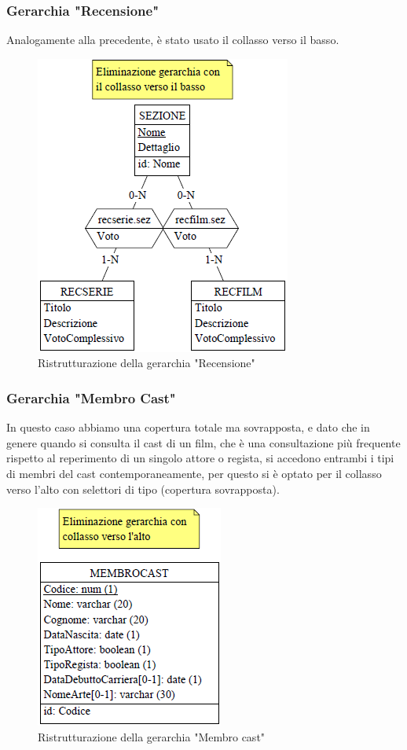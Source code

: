 \documentclass[a4paper,12pt]{report}
\begin{document}
	\subsubsection{Gerarchia "Recensione"}
	Analogamente alla precedente, è stato usato il collasso verso il basso.
	\begin{figure}[H]
		\centering
		\includegraphics{ER/ristrutturazione/ristrecensione.png}
		\caption{Ristrutturazione della gerarchia "Recensione"}
	\end{figure}
	\subsubsection{Gerarchia "Membro Cast"}
	In questo caso abbiamo una copertura totale ma sovrapposta, e dato che in genere quando si consulta il cast di un film, che è una consultazione più frequente rispetto al reperimento di un singolo attore o regista, si accedono entrambi i tipi di membri del cast contemporaneamente, per questo si è optato per il collasso verso l'alto con selettori di tipo (copertura sovrapposta).
	\begin{figure}[H]
		\centering
		\includegraphics{ER/ristrutturazione/ristmembrocast.png}
		\caption{Ristrutturazione della gerarchia "Membro cast"}
	\end{figure}
\end{document}
